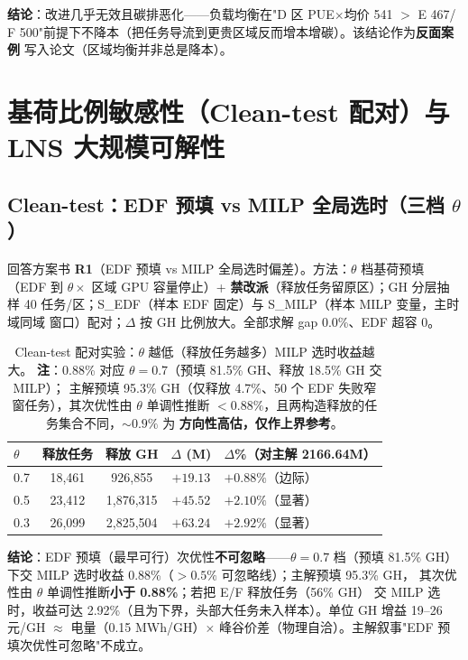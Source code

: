 \documentclass{internal-report}
\begin{document}
\textbf{结论}：改进几乎无效且碳排恶化——负载均衡在"D 区 PUE$\times$均价 541 $>$ E 467/
F 500"前提下不降本（把任务导流到更贵区域反而增本增碳）。该结论作为\textbf{反面案例}
写入论文（区域均衡并非总是降本）。

\section{基荷比例敏感性（Clean-test 配对）与 LNS 大规模可解性}

\subsection{Clean-test：EDF 预填 vs MILP 全局选时（三档 $\theta$）}

回答方案书 \textbf{R1}（EDF 预填 vs MILP 全局选时偏差）。方法：$\theta$ 档基荷预填
（EDF 到 $\theta\times$ 区域 GPU 容量停止）+ \textbf{禁改派}（释放任务留原区）；GH
分层抽样 40 任务/区；S\_EDF（样本 EDF 固定）与 S\_MILP（样本 MILP 变量，主时域同域
窗口）配对；$\Delta$ 按 GH 比例放大。全部求解 gap 0.0\%、EDF 超容 0。

\begin{table}[H]
\centering
\footnotesize
\begin{tabular}{lcccl}
\toprule
$\theta$ & 释放任务 & 释放 GH & $\Delta$ (M) & $\Delta$\%（对主解 2166.64M） \\
\midrule
0.7 & 18,461 & 926,855 & $+19.13$ & $+0.88\%$（边际） \\
0.5 & 23,412 & 1,876,315 & $+45.52$ & $+2.10\%$（显著） \\
0.3 & 26,099 & 2,825,504 & $+63.24$ & $+2.92\%$（显著） \\
\bottomrule
\end{tabular}
\caption{Clean-test 配对实验：$\theta$ 越低（释放任务越多）MILP 选时收益越大。
\textbf{注}：0.88\% 对应 $\theta{=}0.7$（预填 81.5\% GH、释放 18.5\% GH 交 MILP）；
主解预填 95.3\% GH（仅释放 4.7\%、50 个 EDF 失败窄窗任务），其次优性由 $\theta$
单调性推断 \textbf{$<0.88\%$}，且两构造释放的任务集合不同，$\sim 0.9\%$ 为
\textbf{方向性高估，仅作上界参考}。}
\label{tab:clean}
\end{table}

\textbf{结论}：EDF 预填（最早可行）次优性\textbf{不可忽略}——$\theta{=}0.7$ 档（预填
81.5\% GH）下交 MILP 选时收益 0.88\%（$>0.5\%$ 可忽略线）；主解预填 95.3\% GH，
其次优性由 $\theta$ 单调性推断\textbf{小于 0.88\%}；若把 E/F 释放任务（56\% GH）
交 MILP 选时，收益可达 2.92\%（且为下界，头部大任务未入样本）。单位 GH 增益 19--26
元/GH $\approx$ 电量（0.15 MWh/GH）$\times$ 峰谷价差（物理自洽）。主解叙事"EDF
预填次优性可忽略"不成立。
\end{document}
